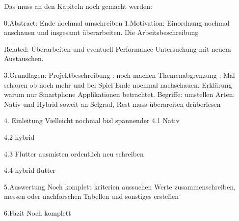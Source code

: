 Das muss an den Kapiteln noch gemacht werden:

0.Abstract:
Ende nochmal umschreiben
1.Motivation:
Einordnung nochmal anschauen und insgesamt überarbeiten.
Die Arbeitsbeschreibung

Related:
Überarbeiten und eventuell Performance Untersuchung mit neuem Austauschen.

3.Grundlagen:
Projektbeschreibung : 
noch machen
Themenabgrenzung :
Mal schauen ob noch mehr und bei Spiel Ende nochmal nachschauen.
Erklärung warum nur Smartphone Applikationen betrachtet.
Begriffe:
umstellen
Arten:
Nativ und Hybrid soweit an Selgrad, Rest muss überareiten
drüberlesen

4. Einleitung
Vielleicht nochmal bisl spannender
4.1 Nativ

4.2 hybrid

4.3 Flutter
ausmisten
ordentlich neu schreiben

4.4 hybrid flutter

5.Auswertung
Noch komplett
kriterien aussuchen
Werte zusammenschreiben, messen oder nachforschen
Tabellen und sonstiges erstellen

6.Fazit
Noch komplett

